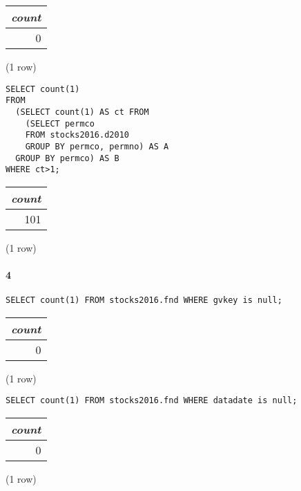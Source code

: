 \documentclass[]{article}
\let\oldparagraph\paragraph
\renewcommand{\paragraph}[1]{\oldparagraph{#1}\mbox{}}
\begin{document}
\begin{center}
\begin{tabular}{r}
\textit{count} \\
\hline
0 \\
\end{tabular}

\noindent (1 row) \\
\end{center}

\color{blue}
\begin{verbatim}
SELECT count(1)
FROM
  (SELECT count(1) AS ct FROM
    (SELECT permco
    FROM stocks2016.d2010
    GROUP BY permco, permno) AS A
  GROUP BY permco) AS B
WHERE ct>1;
\end{verbatim}
\color{black}

\begin{center}
\begin{tabular}{r}
\textit{count} \\
\hline
101 \\
\end{tabular}

\noindent (1 row) \\
\end{center}

\paragraph{4} 

\color{blue}
\begin{verbatim}
SELECT count(1) FROM stocks2016.fnd WHERE gvkey is null;
\end{verbatim}
\color{black}

\begin{center}
\begin{tabular}{r}
\textit{count} \\
\hline
0 \\
\end{tabular}

\noindent (1 row) \\
\end{center}

\color{blue}
\begin{verbatim}
SELECT count(1) FROM stocks2016.fnd WHERE datadate is null;
\end{verbatim}
\color{black}

\begin{center}
\begin{tabular}{r}
\textit{count} \\
\hline
0 \\
\end{tabular}

\noindent (1 row) \\
\end{center}
\end{document}
